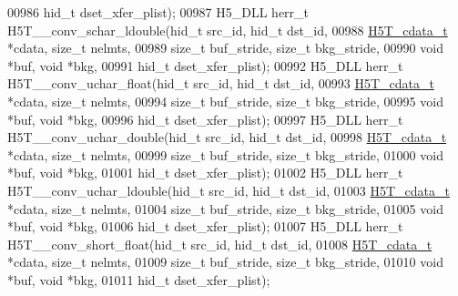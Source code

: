 \begin{DoxyCode}
00986                                      hid\_t dset\_xfer\_plist);
00987 H5\_DLL herr\_t H5T\_\_conv\_schar\_ldouble(hid\_t src\_id, hid\_t dst\_id,
00988                      \hyperlink{struct_h5_t__cdata__t}{H5T\_cdata\_t} *cdata, \textcolor{keywordtype}{size\_t} nelmts,
00989                      \textcolor{keywordtype}{size\_t} buf\_stride, \textcolor{keywordtype}{size\_t} bkg\_stride,
00990                                      \textcolor{keywordtype}{void} *buf, \textcolor{keywordtype}{void} *bkg,
00991                                      hid\_t dset\_xfer\_plist);
00992 H5\_DLL herr\_t H5T\_\_conv\_uchar\_float(hid\_t src\_id, hid\_t dst\_id,
00993                      \hyperlink{struct_h5_t__cdata__t}{H5T\_cdata\_t} *cdata, \textcolor{keywordtype}{size\_t} nelmts,
00994                      \textcolor{keywordtype}{size\_t} buf\_stride, \textcolor{keywordtype}{size\_t} bkg\_stride,
00995                                      \textcolor{keywordtype}{void} *buf, \textcolor{keywordtype}{void} *bkg,
00996                                      hid\_t dset\_xfer\_plist);
00997 H5\_DLL herr\_t H5T\_\_conv\_uchar\_double(hid\_t src\_id, hid\_t dst\_id,
00998                      \hyperlink{struct_h5_t__cdata__t}{H5T\_cdata\_t} *cdata, \textcolor{keywordtype}{size\_t} nelmts,
00999                      \textcolor{keywordtype}{size\_t} buf\_stride, \textcolor{keywordtype}{size\_t} bkg\_stride,
01000                                      \textcolor{keywordtype}{void} *buf, \textcolor{keywordtype}{void} *bkg,
01001                                      hid\_t dset\_xfer\_plist);
01002 H5\_DLL herr\_t H5T\_\_conv\_uchar\_ldouble(hid\_t src\_id, hid\_t dst\_id,
01003                      \hyperlink{struct_h5_t__cdata__t}{H5T\_cdata\_t} *cdata, \textcolor{keywordtype}{size\_t} nelmts,
01004                      \textcolor{keywordtype}{size\_t} buf\_stride, \textcolor{keywordtype}{size\_t} bkg\_stride,
01005                                      \textcolor{keywordtype}{void} *buf, \textcolor{keywordtype}{void} *bkg,
01006                                      hid\_t dset\_xfer\_plist);
01007 H5\_DLL herr\_t H5T\_\_conv\_short\_float(hid\_t src\_id, hid\_t dst\_id,
01008                      \hyperlink{struct_h5_t__cdata__t}{H5T\_cdata\_t} *cdata, \textcolor{keywordtype}{size\_t} nelmts,
01009                      \textcolor{keywordtype}{size\_t} buf\_stride, \textcolor{keywordtype}{size\_t} bkg\_stride,
01010                                      \textcolor{keywordtype}{void} *buf, \textcolor{keywordtype}{void} *bkg,
01011                                      hid\_t dset\_xfer\_plist);

\end{DoxyCode}

